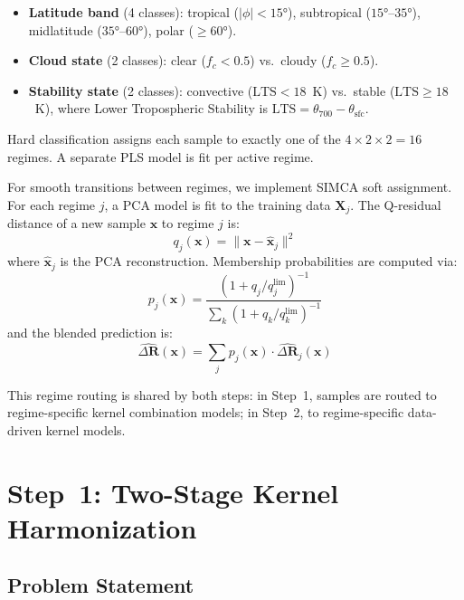 \documentclass[11pt]{article}
\begin{document}
\begin{itemize}[noitemsep]
  \item \textbf{Latitude band} (4 classes): tropical
    ($|\phi| < 15°$), subtropical ($15°$--$35°$), midlatitude
    ($35°$--$60°$), polar ($\geq 60°$).
  \item \textbf{Cloud state} (2 classes): clear ($f_c < 0.5$) vs.\
    cloudy ($f_c \geq 0.5$).
  \item \textbf{Stability state} (2 classes): convective
    ($\text{LTS} < 18$~K) vs.\ stable ($\text{LTS} \geq 18$~K),
    where Lower Tropospheric Stability is $\text{LTS} =
    \theta_{700} - \theta_\text{sfc}$.
\end{itemize}

Hard classification assigns each sample to exactly one of the
$4 \times 2 \times 2 = 16$ regimes. A separate PLS model is fit
per active regime.

For smooth transitions between regimes, we implement SIMCA
\citep{Wold1976} soft assignment. For each regime $j$, a PCA model
is fit to the training data $\mathbf{X}_j$. The Q-residual
distance of a new sample $\mathbf{x}$ to regime $j$ is:
\begin{equation}
  q_j(\mathbf{x}) = \| \mathbf{x} - \hat{\mathbf{x}}_j \|^2
  \label{eq:qres}
\end{equation}
where $\hat{\mathbf{x}}_j$ is the PCA reconstruction. Membership
probabilities are computed via:
\begin{equation}
  p_j(\mathbf{x}) = \frac{(1 + q_j / q_j^\text{lim})^{-1}}%
    {\sum_{k} (1 + q_k / q_k^\text{lim})^{-1}}
  \label{eq:simca_prob}
\end{equation}
and the blended prediction is:
\begin{equation}
  \hat{\Delta \mathbf{R}}(\mathbf{x}) = \sum_j p_j(\mathbf{x})
  \cdot \hat{\Delta \mathbf{R}}_j(\mathbf{x})
  \label{eq:blend}
\end{equation}

This regime routing is shared by both steps: in Step~1, samples
are routed to regime-specific kernel combination models; in
Step~2, to regime-specific data-driven kernel models.

\section{Step~1: Two-Stage Kernel Harmonization}
\label{sec:harmonization}

\subsection{Problem Statement}
\end{document}
